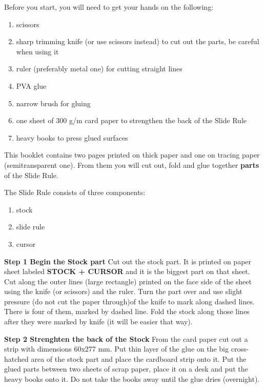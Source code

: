 \documentclass[a4paper,10pt]{article}
\begin{document}
  \begin{multicols*}{2}
  \normalsize{Before you start, you will need to get your hands on the following:
    \begin{enumerate}
      \setlength{\parskip}{0pt}
      \setlength{\parsep}{0pt}
      \item scissors
      \item sharp trimming knife (or use scissors instead) to cut out the parts, be careful when using it
      \item ruler (preferably metal one) for cutting straight lines
      \item PVA glue
      \item narrow brush for gluing
      \item one sheet of 300 g/m card paper to strengthen the back of the Slide Rule
      \item heavy books to press glued surfaces
    \end{enumerate}

  This booklet contains two pages printed on thick paper and one on tracing paper (semitransparent one). From them you will cut out, fold and glue together \textbf{parts} of the Slide Rule.

  The Slide Rule consists of three components:
    \begin{enumerate}
      \setlength{\parskip}{0pt}
      \setlength{\parsep}{0pt}
      \item stock
      \item slide rule
      \item cursor
    \end{enumerate}

  \textbf{Step 1 Begin the Stock part} Cut out the stock part. It is printed on paper sheet labeled \textbf{STOCK + CURSOR} and it is the biggest part on that sheet. Cut along the outer lines (large rectangle) printed on the face side of the sheet using the knife (or scissors) and the ruler. Turn the part over and use slight pressure (do not cut the paper through)of the knife to mark along dashed lines. There is four of them, marked by dashed line. Fold the stock along those lines after they were marked by knife (it will be easier that way).

  \textbf{Step 2 Strenghten the back of the Stock} From the card paper cut out a strip with dimensions 60x277 mm. Put thin layer of the glue on the big cross-hatched area of the stock part and place the cardboard strip onto it. Put the glued parts between two sheets of scrap paper, place it on a desk and put the heavy books onto it. Do not take the books away until the glue dries (overnight).

}
\end{multicols*}
\end{document}
